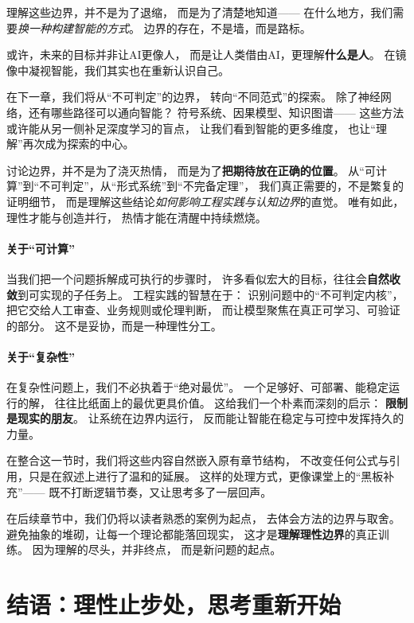 理解这些边界，并不是为了退缩，  
而是为了清楚地知道——  
在什么地方，我们需要\textit{换一种构建智能的方式}。  
边界的存在，不是墙，而是路标。  

或许，未来的目标并非让AI更像人，  
而是让人类借由AI，更理解\textbf{什么是人}。  
在镜像中凝视智能，我们其实也在重新认识自己。

在下一章，我们将从“不可判定”的边界，  
转向“不同范式”的探索。  
除了神经网络，还有哪些路径可以通向智能？  
符号系统、因果模型、知识图谱——  
这些方法或许能从另一侧补足深度学习的盲点，  
让我们看到智能的更多维度，  
也让“理解”再次成为探索的中心。

\newpage

讨论边界，并不是为了浇灭热情，  
而是为了\textbf{把期待放在正确的位置}。  
从“可计算”到“不可判定”，从“形式系统”到“不完备定理”，  
我们真正需要的，不是繁复的证明细节，  
而是理解这些结论\textit{如何影响工程实践与认知边界}的直觉。  
唯有如此，理性才能与创造并行，  
热情才能在清醒中持续燃烧。

\paragraph{关于“可计算”}
当我们把一个问题拆解成可执行的步骤时，  
许多看似宏大的目标，往往会\textbf{自然收敛}到可实现的子任务上。  
工程实践的智慧在于：  
识别问题中的“不可判定内核”，  
把它交给人工审查、业务规则或伦理判断，  
而让模型聚焦在真正可学习、可验证的部分。  
这不是妥协，而是一种理性分工。

\paragraph{关于“复杂性”}
在复杂性问题上，我们不必执着于“绝对最优”。  
一个足够好、可部署、能稳定运行的解，  
往往比纸面上的最优更具价值。  
这给我们一个朴素而深刻的启示：  
\textbf{限制是现实的朋友}。  
让系统在边界内运行，  
反而能让智能在稳定与可控中发挥持久的力量。

在整合这一节时，我们将这些内容自然嵌入原有章节结构，  
不改变任何公式与引用，只是在叙述上进行了温和的延展。  
这样的处理方式，更像课堂上的“黑板补充”——  
既不打断逻辑节奏，又让思考多了一层回声。

在后续章节中，我们仍将以读者熟悉的案例为起点，  
去体会方法的边界与取舍。  
避免抽象的堆砌，让每一个理论都能落回现实，  
这才是\textbf{理解理性边界}的真正训练。  
因为理解的尽头，并非终点，  
而是新问题的起点。

\section*{结语：理性止步处，思考重新开始}

